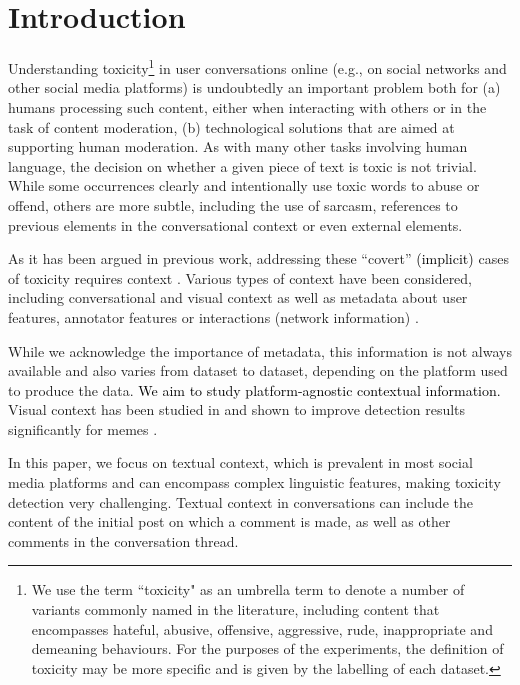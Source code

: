 \documentclass[acmsmall]{acmart}
\newcommand{\red}[1]{\textcolor{black}{#1}}
\begin{document}
\maketitle

\section{Introduction}

Understanding toxicity\footnote{We use the term ``toxicity" as an umbrella term to denote a number of variants commonly named in the literature, including content that encompasses hateful, abusive, offensive, aggressive, rude, inappropriate and demeaning behaviours. For the purposes of the experiments, the definition of toxicity may be more specific and is given by the labelling of each dataset.} in user conversations online (e.g., on social networks and other social media platforms) is undoubtedly an important problem both for (a) humans processing such content, either when interacting with others or in the task of content moderation, (b) technological solutions that are aimed at supporting human moderation. As with many other tasks involving human language, the decision on whether a given piece of text is toxic is not trivial. While some occurrences clearly and intentionally use toxic words to abuse or offend, others are more subtle, including the use of sarcasm, references to previous elements in the conversational context or even external elements. 

As it has been argued in previous work, addressing these ``covert'' \red{(implicit)} cases of toxicity requires  context  \cite{jurgens-etal-2019-just,vidgen-etal-2019-challenges,caselli-EtAl:2020:LREC}. Various types  of context have been considered, including conversational and visual context as well as metadata about user features, annotator features or interactions (network information) \cite{ribeiro2018like}.

While we acknowledge the importance of metadata, this information is not always available and also varies from dataset to dataset, depending on the platform used to produce the data. \red{We aim to study platform-agnostic contextual information.} Visual context has been studied in  \cite{gomez2019exploring,yang-etal-2019-exploring-deep,kiela2021hateful} and shown to improve detection results significantly for memes \cite{kiela2021hateful}.
 
In this paper, we focus on textual context, which is prevalent in most social media platforms and can encompass complex linguistic features, making toxicity detection very challenging. Textual context in conversations can include the content of the initial post on which a comment is made, as well as other comments in the conversation thread. 
\end{document}
